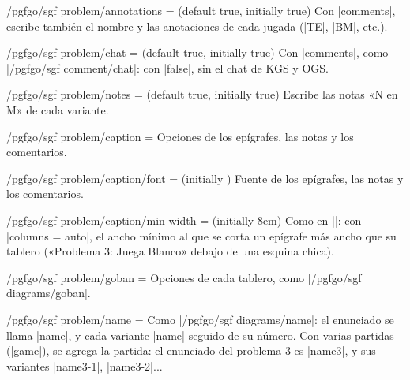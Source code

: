 \begin{key}{/pgfgo/sgf problem/annotations =  (default true, initially true)}
	Con |comments|, escribe también el nombre y las anotaciones de cada jugada (|TE|, |BM|, etc.).
\end{key}

\begin{key}{/pgfgo/sgf problem/chat =  (default true, initially true)}
	Con |comments|, como |/pgfgo/sgf comment/chat|: con |false|, sin el chat de KGS y OGS.
\end{key}

\begin{key}{/pgfgo/sgf problem/notes =  (default true, initially true)}
	Escribe las notas «N en M» de cada variante.
\end{key}

\begin{key}{/pgfgo/sgf problem/caption = }
	Opciones de los epígrafes, las notas y los comentarios.
\end{key}

\begin{key}{/pgfgo/sgf problem/caption/font =  (initially \texttt{\string\small})}
	Fuente de los epígrafes, las notas y los comentarios.

	\begin{codeexample}
	\end{codeexample}

\end{key}

\begin{key}{/pgfgo/sgf problem/caption/min width =  (initially 8em)}
	Como en |\sgfdiagrams|: con |columns = auto|, el ancho mínimo al que se corta un epígrafe más ancho que su tablero («Problema 3: Juega Blanco» debajo de una esquina chica).
\end{key}

\begin{key}{/pgfgo/sgf problem/goban = }
	Opciones de cada tablero, como |/pgfgo/sgf diagrams/goban|.
\end{key}

\begin{key}{/pgfgo/sgf problem/name = }
	Como |/pgfgo/sgf diagrams/name|: el enunciado se llama |name|, y cada variante |name| seguido de su número. Con varias partidas (|game|), se agrega la partida: el enunciado del problema 3 es |name3|, y sus variantes |name3-1|, |name3-2|...
\end{key}

